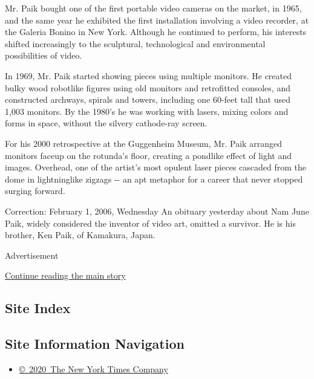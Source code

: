 Mr. Paik bought one of the first portable video cameras on the market,
in 1965, and the same year he exhibited the first installation involving
a video recorder, at the Galeria Bonino in New York. Although he
continued to perform, his interests shifted increasingly to the
sculptural, technological and environmental possibilities of video.

In 1969, Mr. Paik started showing pieces using multiple monitors. He
created bulky wood robotlike figures using old monitors and retrofitted
consoles, and constructed archways, spirals and towers, including one
60-feet tall that used 1,003 monitors. By the 1980's he was working with
lasers, mixing colors and forms in space, without the silvery
cathode-ray screen.

For his 2000 retrospective at the Guggenheim Museum, Mr. Paik arranged
monitors faceup on the rotunda's floor, creating a pondlike effect of
light and images. Overhead, one of the artist's most opulent laser
pieces cascaded from the dome in lightninglike zigzags -\/- an apt
metaphor for a career that never stopped surging forward.

Correction: February 1, 2006, Wednesday An obituary yesterday about Nam
June Paik, widely considered the inventor of video art, omitted a
survivor. He is his brother, Ken Paik, of Kamakura, Japan.

Advertisement

\protect\hyperlink{after-bottom}{Continue reading the main story}

\hypertarget{site-index}{%
\subsection{Site Index}\label{site-index}}

\hypertarget{site-information-navigation}{%
\subsection{Site Information
Navigation}\label{site-information-navigation}}

\begin{itemize}
\tightlist
\item
  \href{https://help.nytimes3xbfgragh.onion/hc/en-us/articles/115014792127-Copyright-notice}{©~2020~The
  New York Times Company}
\end{itemize}

